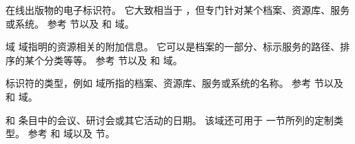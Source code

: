 \begin{fieldlist}

在线出版物的电子标识符。
它大致相当于 ，但专门针对某个档案、资源库、服务或系统。
参考  节以及  和  域。




域  域指明的资源相关的附加信息。
它可以是档案的一部分、标示服务的路径、排序的某个分类等等。
参考  节以及  和  域。




 标识符的类型，例如  域所指的档案、资源库、服务或系统的名称。
参考  节以及  和  域。




 和  条目中的会议、研讨会或其它活动的日期。
该域还可用于  一节所列的定制类型。
参考  和  域以及  节。




\end{fieldlist}

